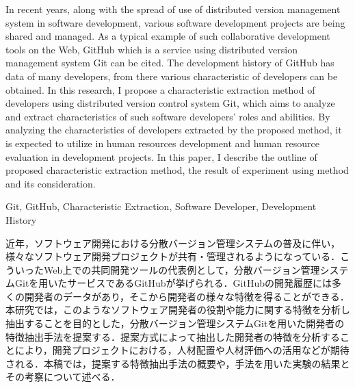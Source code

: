 \documentclass{funthesis}
\begin{document}
\maketitle       %
\begin{eabstract}
In recent years, along with the spread of use of distributed version management system in software development, various software development projects are being shared and managed. As a typical example of such collaborative development tools on the Web, GitHub which is a service using distributed version management system Git can be cited. The development history of GitHub has data of many developers, from there various characteristic of developers can be obtained. In this research, I propose a characteristic extraction method of developers using distributed version control system Git, which aims to analyze and extract characteristics of such software developers' roles and abilities. By analyzing the characteristics of developers extracted by the proposed method, it is expected to utilize in human resources development and human resource evaluation in development projects. In this paper, I describe the outline of proposed characteristic extraction method, the result of experiment using method and its consideration.
\end{eabstract}

\begin{ekeyword}
Git, GitHub, Characteristic Extraction, Software Developer, Development History\end{ekeyword}

\begin{jabstract}
近年，ソフトウェア開発における分散バージョン管理システムの普及に伴い，様々なソフトウェア開発プロジェクトが共有・管理されるようになっている．こういったWeb上での共同開発ツールの代表例として，分散バージョン管理システムGitを用いたサービスであるGitHubが挙げられる．GitHubの開発履歴には多くの開発者のデータがあり，そこから開発者の様々な特徴を得ることができる．本研究では，このようなソフトウェア開発者の役割や能力に関する特徴を分析し抽出することを目的とした，分散バージョン管理システムGitを用いた開発者の特徴抽出手法を提案する．提案方式によって抽出した開発者の特徴を分析することにより，開発プロジェクトにおける，人材配置や人材評価への活用などが期待される．本稿では，提案する特徴抽出手法の概要や，手法を用いた実験の結果とその考察について述べる．
\end{jabstract}
\end{document}
